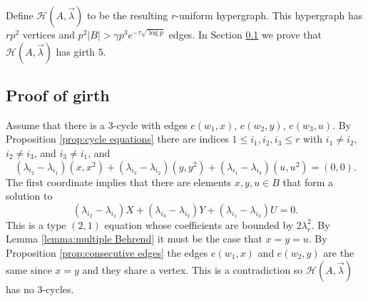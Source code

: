 \documentclass[12pt]{article}%
\newcommand{\coeff}[2]{( \lambda_{i_#1} - \lambda_{i_#2} ) }
\begin{document}
 Define $\mathcal{H}( A , \vec{ \lambda} )$ to be
 the resulting $r$-uniform hypergraph.  This hypergraph 
 has $r p^2$ vertices and $p^2 |B| >  \gamma p^3 e^{ - \tau \sqrt{ \log p } }$ edges.  In Section \ref{sec: proof of girth number theory} we prove that $\mathcal{H}( A , \vec{ \lambda} )$ has girth $5$. 




\subsection{Proof of girth}\label{sec: proof of girth number theory}

\medskip {} Assume that there is a 3-cycle with edges 
$e(w_1 , x)$, $e(w_2,y)$, $e(w_3,u)$.  
By Proposition \ref{prop:cycle equations} there are indices $1 \leq i_1,i_2,i_3 \leq r$ with $i_1 \neq i_2$, $i_2 \neq i_3$, and $i_3 \neq i_1$, and 
\[
( \lambda_{i_2} - \lambda_{i_1} ) (x,x^2)
+ 
(\lambda_{i_3} - \lambda_{i_2} ) (y,y^2)
+ 
(\lambda_{i_1} - \lambda_{i_3} ) (u,u^2) 
=(0,0).  
\]
The first coordinate implies that there are elements $x,y,u \in B$ that form a solution to  
\[
\coeff{2}{1} X + \coeff{3}{2} Y + \coeff{1}{3}U = 0.
\]
This is a type $(2,1)$ equation whose coefficients 
are bounded by $2 \lambda_r^2$.  By Lemma \ref{lemma:multiple Behrend} it must be 
the case that $x=y=u$.  By Proposition \ref{prop:consecutive edges} the edges $e(w_1,x)$ and $e(w_2,y) $ are the same since $x = y$ and they share a vertex.  This is a contradiction so $\mathcal{H}(A , \vec{ \lambda })$ has no 3-cycles.  
\end{document}
